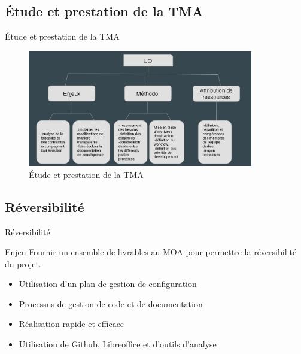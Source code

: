 \ZacSpeak
\subsection{Étude et prestation de la TMA}
\begin{frame}{Étude et prestation de la TMA}
	\begin{figure}[H]
		\centering
		\includegraphics[width=9.85cm]{etude-presta.png}
		\caption{Étude et prestation de la TMA}
	\end{figure}
\end{frame}

\DylanSpeak
\subsection{Réversibilité}
\begin{frame}{Réversibilité}
	\begin{block}{Enjeu}
		Fournir un ensemble de livrables au MOA pour permettre la réversibilité du projet.
	\end{block}
	\pause
	\begin{itemize}
		\item Utilisation d'un plan de gestion de configuration
		\item Processus de gestion de code et de documentation
		\item Réalisation rapide et efficace
		\item Utilisation de Github, Libreoffice et d'outils d'analyse
	\end{itemize}
\end{frame}
\AntoineSpeak

